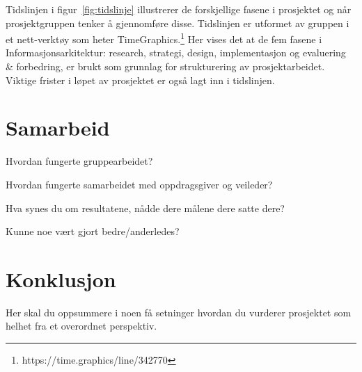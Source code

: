 \documentclass[11pt,a4paper]{report}
\begin{document}
Tidslinjen i figur~\ref{fig:tidslinje} illustrerer de forskjellige fasene i prosjektet og når prosjektgruppen tenker å gjennomføre disse. Tidslinjen er utformet av gruppen i et nett-verktøy som heter TimeGraphics.\footnote{https://time.graphics/line/342770} Her vises det at de fem fasene i Informasjonsarkitektur: research, strategi, design, implementasjon og evaluering \& forbedring, er brukt som grunnlag for strukturering av prosjektarbeidet. Viktige frister i løpet av prosjektet er også lagt inn i tidslinjen.

\section*{Samarbeid}

Hvordan fungerte gruppearbeidet?

Hvordan fungerte samarbeidet med oppdragsgiver og veileder?
    
Hva synes du om resultatene, nådde dere målene dere satte dere?

Kunne noe vært gjort bedre/anderledes? 

\section*{Konklusjon}

Her skal du oppsummere i noen få setninger hvordan du vurderer prosjektet som helhet fra et overordnet perspektiv.
\end{document}
